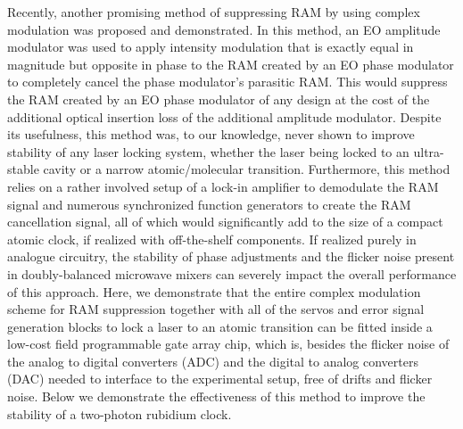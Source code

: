 \documentclass[aip,graphicx]{revtex4-2}
\begin{document}
	Recently, another promising method of suppressing RAM by using complex modulation was proposed and demonstrated.\cite{Aronson2019, Chia2022} In this method, an EO amplitude modulator was used to apply intensity modulation that is exactly equal in magnitude but opposite in phase to the RAM created by an EO phase modulator to completely cancel the phase modulator’s parasitic RAM. This would suppress the RAM created by an EO phase modulator of any design at the cost of the additional optical insertion loss of the additional amplitude modulator. Despite its usefulness, this method was, to our knowledge, never shown to improve stability of any laser locking system, whether the laser being locked to an ultra-stable cavity or a narrow atomic/molecular transition. Furthermore, this method relies on a rather involved setup of a lock-in amplifier to demodulate the RAM signal and numerous synchronized function generators to create the RAM cancellation signal, all of which would significantly add to the size of a compact atomic clock, if realized with off-the-shelf components. If realized purely in analogue circuitry, the stability of phase adjustments and the flicker noise present in doubly-balanced microwave mixers can severely impact the overall performance of this approach. Here, we demonstrate that the entire complex modulation scheme for RAM suppression together with all of the servos and error signal generation blocks to lock a laser to an atomic transition can be fitted inside a low-cost field programmable gate array chip, which is, besides the flicker noise of the analog to digital converters (ADC) and the digital to analog converters (DAC) needed to interface to the experimental setup, free of drifts and flicker noise. Below we demonstrate the effectiveness of this method to improve the stability of a two-photon rubidium clock.
	
\end{document}

